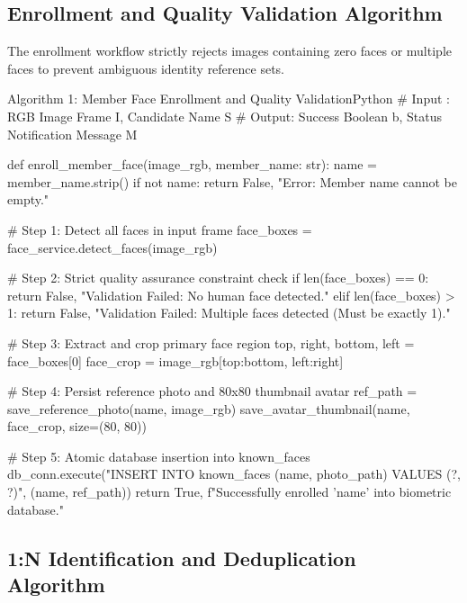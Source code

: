 \documentclass[12pt,a4paper]{article}
\begin{document}
\subsection{Enrollment and Quality Validation Algorithm}
The enrollment workflow strictly rejects images containing zero faces or multiple faces to prevent ambiguous identity reference sets.

\begin{modernblock}{Algorithm 1: Member Face Enrollment and Quality Validation}{Python}
# Input : RGB Image Frame I, Candidate Name S
# Output: Success Boolean b, Status Notification Message M

def enroll_member_face(image_rgb, member_name: str):
    name = member_name.strip()
    if not name:
        return False, "Error: Member name cannot be empty."
        
    # Step 1: Detect all faces in input frame
    face_boxes = face_service.detect_faces(image_rgb)
    
    # Step 2: Strict quality assurance constraint check
    if len(face_boxes) == 0:
        return False, "Validation Failed: No human face detected."
    elif len(face_boxes) > 1:
        return False, "Validation Failed: Multiple faces detected (Must be exactly 1)."
        
    # Step 3: Extract and crop primary face region
    top, right, bottom, left = face_boxes[0]
    face_crop = image_rgb[top:bottom, left:right]
    
    # Step 4: Persist reference photo and 80x80 thumbnail avatar
    ref_path = save_reference_photo(name, image_rgb)
    save_avatar_thumbnail(name, face_crop, size=(80, 80))
    
    # Step 5: Atomic database insertion into known_faces
    db_conn.execute("INSERT INTO known_faces (name, photo_path) VALUES (?, ?)", (name, ref_path))
    return True, f"Successfully enrolled '{name}' into biometric database."
\end{modernblock}

\subsection{1:N Identification and Deduplication Algorithm}
\end{document}
